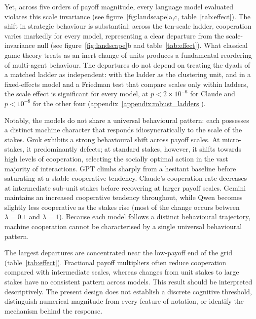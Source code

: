 \documentclass[11pt,a4paper]{article}
\newcommand{\lam}{\lambda}
\newcommand{\rev}[1]{{\color{red}#1}}
\newcommand{\rev}[1]{#1}
\begin{document}
Yet, across five orders of payoff magnitude, every language model
evaluated violates this scale invariance (see figure~\ref{fig:landscape}a,c,
table~\ref{tab:effect}). The shift in strategic behaviour is substantial: across
the ten-scale ladder, cooperation varies markedly for every model, representing a clear departure from the scale-invariance null (see figure~\ref{fig:landscape}b and
table~\ref{tab:effect}). What classical game theory treats as an inert change of
units produces a fundamental reordering of multi-agent behaviour.
\rev{The departures do not depend on treating the dyads of a matched ladder as
independent: with the ladder as the clustering unit, and in a fixed-effects
model and a Friedman test that compare scales only within ladders, the scale
effect is significant for every model, at $p < 2\times10^{-6}$ for Claude and
$p < 10^{-8}$ for the other four (appendix~\ref{appendix:robust_ladders}).}

Notably, the models do not share a universal behavioural pattern: each
possesses a distinct machine character that responds idiosyncratically to the
scale of the stakes. Grok exhibits a \rev{strong behavioural} shift across payoff scales. At micro-stakes, it predominantly  defects; at standard stakes, however, it shifts towards high levels of cooperation, selecting the socially optimal action in the vast majority of interactions. 
GPT climbs sharply
from a hesitant baseline before saturating at a stable cooperative tendency.
Claude’s cooperation rate decreases  at intermediate sub-unit stakes before recovering at larger payoff scales. Gemini maintains an
increased  cooperative tendency throughout, while Qwen becomes slightly less cooperative as the stakes rise (most of the \rev{change occurs} between $\lam = 0.1$ and $\lam = 1$).
Because each model follows a distinct behavioural trajectory, machine cooperation cannot be characterised by a single universal behavioural pattern.

The largest departures are concentrated near the low-payoff end of the grid
(table~\ref{tab:effect}). Fractional payoff multipliers often reduce cooperation
compared with intermediate scales, whereas changes from unit stakes to large stakes
have no consistent pattern across models. This result should be interpreted descriptively. The present design does not establish a discrete cognitive
threshold, distinguish numerical magnitude from every feature of notation, or
identify the mechanism behind the response.
\end{document}
